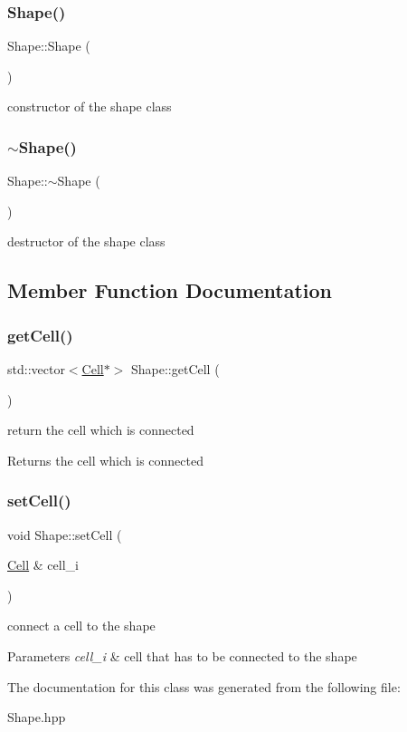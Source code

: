 \subsubsection{\texorpdfstring{Shape()}{Shape()}}
{\footnotesize\ttfamily Shape\+::\+Shape (\begin{DoxyParamCaption}{ }\end{DoxyParamCaption})}

constructor of the shape class \mbox{\label{class_shape_a935afc9e576015f967d90de56977167d}} 
\subsubsection{\texorpdfstring{$\sim$\+Shape()}{~Shape()}}
{\footnotesize\ttfamily Shape\+::$\sim$\+Shape (\begin{DoxyParamCaption}{ }\end{DoxyParamCaption})}

destructor of the shape class 

\subsection{Member Function Documentation}
\mbox{\label{class_shape_a6b721d81c8f21efe182682d8d7caf794}} 
\subsubsection{\texorpdfstring{get\+Cell()}{getCell()}}
{\footnotesize\ttfamily std\+::vector$<$\mbox{\hyperlink{class_cell}{Cell}}$\ast$$>$ Shape\+::get\+Cell (\begin{DoxyParamCaption}{ }\end{DoxyParamCaption})}

return the cell which is connected \begin{DoxyReturn}{Returns}
the cell which is connected 
\end{DoxyReturn}
\mbox{\label{class_shape_af40ad140cf111c7d50923fbe140da9ad}} 
\subsubsection{\texorpdfstring{set\+Cell()}{setCell()}}
{\footnotesize\ttfamily void Shape\+::set\+Cell (\begin{DoxyParamCaption}\item[{\mbox{\hyperlink{class_cell}{Cell}} \&}]{cell\+\_\+i }\end{DoxyParamCaption})}

connect a cell to the shape 
\begin{DoxyParams}{Parameters}
{\em cell\+\_\+i} & cell that has to be connected to the shape \\
\hline
\end{DoxyParams}


The documentation for this class was generated from the following file\+:\begin{DoxyCompactItemize}
\item 
Shape.\+hpp\end{DoxyCompactItemize}
